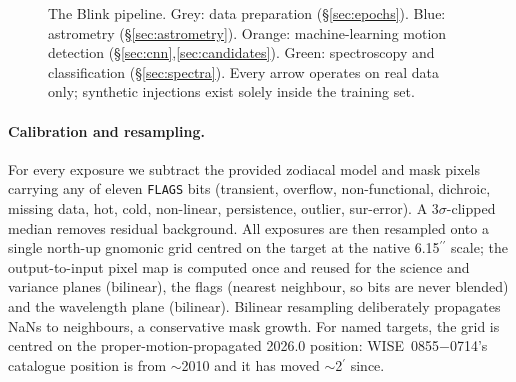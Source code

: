 \documentclass[10pt,twocolumn]{article}
\newcommand{\asec}{\ensuremath{^{\prime\prime}}}
\newcommand{\amin}{\ensuremath{^{\prime}}}
\newcommand{\wise}{WISE~0855$-$0714}
\begin{document}
\begin{figure}[t]
\caption{The Blink pipeline. Grey: data preparation (\S\ref{sec:epochs}). Blue: astrometry
(\S\ref{sec:astrometry}). Orange: machine-learning motion detection (\S\ref{sec:cnn},\ref{sec:candidates}).
Green: spectroscopy and classification (\S\ref{sec:spectra}). Every arrow operates on real data only;
synthetic injections exist solely inside the training set.}
\label{fig:pipeline}
\end{figure}

\paragraph{Calibration and resampling.} For every exposure we subtract the provided zodiacal model and
mask pixels carrying any of eleven \texttt{FLAGS} bits (transient, overflow, non-functional, dichroic,
missing data, hot, cold, non-linear, persistence, outlier, sur-error). A $3\sigma$-clipped median removes
residual background. All exposures are then resampled onto a single north-up gnomonic grid centred on the
target at the native 6.15\asec{} scale; the output-to-input pixel map is computed once and reused for the
science and variance planes (bilinear), the flags (nearest neighbour, so bits are never blended) and the
wavelength plane (bilinear). Bilinear resampling deliberately propagates NaNs to neighbours, a conservative
mask growth. For named targets, the grid is centred on the proper-motion-propagated 2026.0 position:
\wise's catalogue position is from $\sim$2010 and it has moved $\sim$2\amin{} since.
\end{document}
